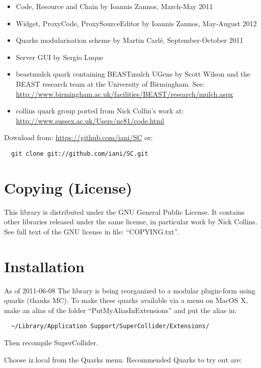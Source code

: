 \documentclass[11pt, a4paper]{scrartcl}
\begin{document}
\begin{itemize}
\item Code, Resource and Chain by Ioannis Zannos, March-May 2011
\item Widget, ProxyCode, ProxySourceEditor by Ioannis Zannos, May-August 2012
\item Quarks modularisation scheme by Martin Carl\'e, September-October 2011
\item Server GUI by Sergio Luque
\item beastmulch quark containing BEASTmulch UGens by Scott Wilson and the 
  BEAST research team at the University of Birmingham. See: \href{http://www.birmingham.ac.uk/facilities/BEAST/research/mulch.aspx}{http://www.birmingham.ac.uk/facilities/BEAST/research/mulch.aspx}
\item collins quark group ported from Nick Collin's work at: \href{http://www.sussex.ac.uk/Users/nc81/code.html}{http://www.sussex.ac.uk/Users/nc81/code.html}
\end{itemize}

Download from: \href{https://github.com/iani/SC}{https://github.com/iani/SC}
or:
\begin{verbatim}
  git clone git://github.com/iani/SC.git
\end{verbatim}
\section*{Copying (License)}
\label{sec-3}


This library is distributed under the GNU General Public License. It contains other libraries released under the same license, in particular work by Nick Collins. See full text of the GNU license in file: ``COPYING.txt''.
\section*{Installation}
\label{sec-4}


As of 2011-06-08 The library is being reorganized to a modular plugin-form using quarks (thanks MC). To make these quarks available via a menu on MacOS X, make an alias of the folder ``PutMyAliasInExtensions'' and put the alias in:

\begin{verbatim}
  ~/Library/Application Support/SuperCollider/Extensions/
\end{verbatim}


Then recompile SuperCollider. 

Choose iz.local from the Quarks menu.  Recommended Quarks to try out are: 
\end{document}
